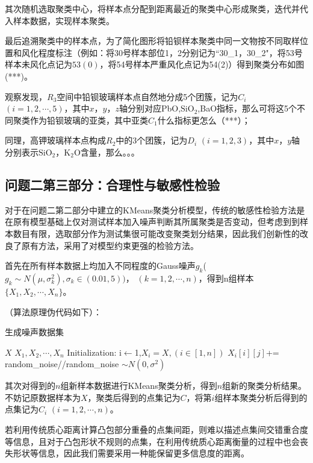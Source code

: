 \documentclass[withoutpreface,bwprint]{cumcmthesis}
\newcommand{\mr}[1]{\mathrm{#1}}
\begin{document}
其次随机选取聚类中心，将样本点分配到距离最近的聚类中心形成聚类，迭代并代入样本数据，实现样本聚类。

最后追溯聚类中的样本点，为了简化图形将铅钡样本聚类中同一文物按不同取样位置和风化程度标注（例如：将30号样本部位1，2分别记为“30\_1，30\_2"，将53号样本未风化点记为$53(0)$，将54号样本严重风化点记为54(2)）得到聚类分布如图(***)。

观察发现，$R_3$空间中铅钡玻璃样本点自然地分成5个团簇，记为$C_i$ $(i=1,2,\cdots,5)$，其中$x$，$y$，$z$轴分别对应PbO,$\mr{SiO_2}$,BaO指标，那么可将这5个不同聚类作为铅钡玻璃的亚类，其中亚类$C_1$什么指标更怎么（***）；

同理，高钾玻璃样本点构成$R_2$中的3个团簇，记为$D_i$ $(i=1,2,3)$，其中$x$，$y$轴分别表示$\mr{SiO_2}$，$\mr{K_2O}$含量，那么。。。

\subsection{问题二第三部分：合理性与敏感性检验}


对于在问题二第二部分中建立的KMeans聚类分析模型，传统的敏感性检验方法是在原有模型基础上仅对测试样本加入噪声判断其所属聚类是否变动，但考虑到到样本数目有限，选取部分作为测试集很可能改变聚类划分结果，因此我们创新性的改良了原有方法，采用了对模型约束更强的检验方法。


首先在所有样本数据上均加入不同程度的Gauss噪声$g_k$($g_k\sim N(\mu ,\sigma_k^2 ),\sigma_k\in(0.01,5))$， $(k=1,2,\cdots,n)$，得到n组样本$\{X_1,X_2,\cdots,X_n\}$。

（算法原理伪代码如下）：

\begin{algorithm}[H]
\caption{生成噪声数据集}
\label{alg:生成噪声数据集}
\begin{algorithmic}[1]
	\Require $X$
	\Ensure $X_1,X_2,\cdots,X_n$
	\State Initialization: i${\leftarrow}$1,${X_i=X,(i \in [1,n])}$
		\State ${X_i[i][j]}$+= random\_noise\quad //random\_noise $\sim N(0,\sigma^2)$
		\EndFor
	\EndFor
\end{algorithmic}
\end{algorithm}

其次对得到的$n$组新样本数据进行KMeans聚类分析，得到$n$组新的聚类分析结果。不妨记原数据样本为$X$，聚类后得到的点集记为$C$，将第$i$组样本聚类分析后得到的点集记为$C_i$ $(i=1,2,\cdots,n)$。

若利用传统质心距离计算凸包部分重叠的点集间距，则难以描述点集间交错重合度等信息，且对于凸包形状不规则的点集，在利用传统质心距离衡量的过程中也会丧失形状等信息，因此我们需要采用一种能保留更多信息度的距离。
\end{document}

